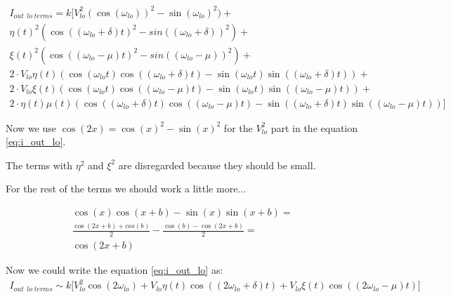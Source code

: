 \vspace{0.5cm}
\begin{equation}
\label{eq:i_out_lo}
\begin{gathered}
    I_{out}\;_{lo\;terms} = k \big[
    V_{lo}^2(\cos(\omega_{lo}))^2-\sin(\omega_{lo})^2) +\\ \eta(t)^2(\cos((\omega_{lo}+\delta)t)^2-sin((\omega_{lo}+\delta))^2)+\\
    \xi(t)^2(\cos((\omega_{lo}-\mu)t)^2-sin((\omega_{lo}-\mu))^2)+\\
    2\cdot V_{lo}\eta(t)\left(
    \cos(\omega_{lo}t)\cos((\omega_{lo}+\delta)t)-
    \sin(\omega_{lo}t)\sin((\omega_{lo}+\delta)t)
    \right)+ \\
    2\cdot V_{lo}\xi(t) \left(
    \cos(\omega_{lo}t)\cos((\omega_{lo}-\mu)t)-
    \sin(\omega_{lo}t)\sin((\omega_{lo}-\mu)t)
    \right)+\\
    2\cdot \eta(t)\mu(t) \left(
    \cos((\omega_{lo}+\delta)t)\cos((\omega_{lo}-\mu)t)-
    \sin((\omega_{lo}+\delta)t)\sin((\omega_{lo}-\mu)t)
    \right)
    \big]
\end{gathered}
\end{equation}

\vspace{0.5cm}
Now we use $\cos(2x) = \cos(x)^2-\sin(x)^2$ for the $V_{lo}^2$ part in the equation \ref{eq:i_out_lo}.


The terms with $\eta^2$ and $\xi^2$ are disregarded because they should be small.


For the rest of the terms we should work a little more...

\begin{equation}
    \begin{gathered}
        \cos(x)\cos(x+b)-\sin(x)\sin(x+b) = \\
        \frac{\cos(2x+b)+cos(b)}{2}-\frac{\cos(b)-\cos(2x+b)}{2} = \\
        \cos(2x+b)
    \end{gathered}
\end{equation}

\vspace{0.5cm}

Now we could write the equation \ref{eq:i_out_lo} as:
\begin{equation}
    \boxed{
    \begin{gathered}
        I_{out}\;_{lo\;terms} \sim k \big[
        V_{lo}^2\cos(2\omega_{lo})+
        V_{lo}\eta(t)\cos((2\omega_{lo}+\delta)t)+V_{lo}\xi(t)\cos((2\omega_{lo}-\mu)t) \big]
    \end{gathered} }
\end{equation}

